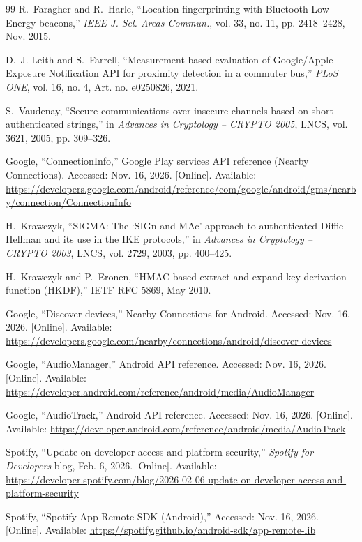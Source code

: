 \documentclass[conference]{IEEEtran}
\begin{document}
\begin{thebibliography}{99}
R.~Faragher and R.~Harle, ``Location fingerprinting with Bluetooth Low Energy beacons,'' \emph{IEEE J. Sel. Areas Commun.}, vol. 33, no. 11, pp. 2418--2428, Nov. 2015.

D.~J. Leith and S.~Farrell, ``Measurement-based evaluation of Google/Apple Exposure Notification API for proximity detection in a commuter bus,'' \emph{PLoS ONE}, vol. 16, no. 4, Art. no. e0250826, 2021.

S.~Vaudenay, ``Secure communications over insecure channels based on short authenticated strings,'' in \emph{Advances in Cryptology -- CRYPTO 2005}, LNCS, vol. 3621, 2005, pp. 309--326.

Google, ``ConnectionInfo,'' Google Play services API reference (Nearby Connections). Accessed: Nov. 16, 2026. [Online]. Available: \url{https://developers.google.com/android/reference/com/google/android/gms/nearby/connection/ConnectionInfo}

H.~Krawczyk, ``SIGMA: The `SIGn-and-MAc' approach to authenticated Diffie-Hellman and its use in the IKE protocols,'' in \emph{Advances in Cryptology -- CRYPTO 2003}, LNCS, vol. 2729, 2003, pp. 400--425.

H.~Krawczyk and P.~Eronen, ``HMAC-based extract-and-expand key derivation function (HKDF),'' IETF RFC 5869, May 2010.

Google, ``Discover devices,'' Nearby Connections for Android. Accessed: Nov. 16, 2026. [Online]. Available: \url{https://developers.google.com/nearby/connections/android/discover-devices}

Google, ``AudioManager,'' Android API reference. Accessed: Nov. 16, 2026. [Online]. Available: \url{https://developer.android.com/reference/android/media/AudioManager}

Google, ``AudioTrack,'' Android API reference. Accessed: Nov. 16, 2026. [Online]. Available: \url{https://developer.android.com/reference/android/media/AudioTrack}

Spotify, ``Update on developer access and platform security,'' \emph{Spotify for Developers} blog, Feb. 6, 2026. [Online]. Available: \url{https://developer.spotify.com/blog/2026-02-06-update-on-developer-access-and-platform-security}

Spotify, ``Spotify App Remote SDK (Android),'' Accessed: Nov. 16, 2026. [Online]. Available: \url{https://spotify.github.io/android-sdk/app-remote-lib}

\end{thebibliography}
\end{document}
